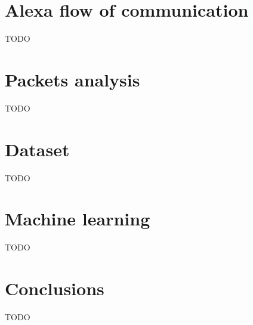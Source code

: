 \documentclass[sigconf]{acmart}
\begin{document}
\section{Alexa flow of communication}
TODO

\section{Packets analysis}
TODO

\section{Dataset}
TODO

\section{Machine learning}
TODO

\section{Conclusions}
TODO



\end{document}
